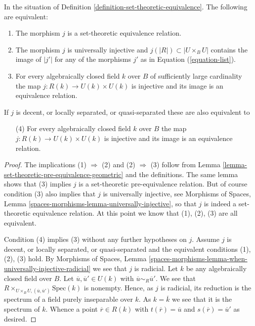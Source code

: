 \begin{lemma}
\label{lemma-set-theoretic-equivalence-geometric}
In the situation of Definition \ref{definition-set-theoretic-equivalence}.
The following are equivalent:
\begin{enumerate}
\item The morphism $j$ is a set-theoretic equivalence relation.
\item The morphism $j$ is universally injective and
$j(|R|) \subset |U \times_B U|$ contains the image of
$|j'|$ for any of the morphisms $j'$ as in Equation (\ref{equation-list}).
\item For every algebraically closed field $k$ over $B$ of sufficiently large
cardinality the map $j : R(k) \to U(k) \times U(k)$ is injective and
its image is an equivalence relation.
\end{enumerate}
If $j$ is decent, or locally separated, or quasi-separated
these are also equivalent to
\begin{enumerate}
\item[(4)] For every algebraically closed field $k$ over $B$
the map $j : R(k) \to U(k) \times U(k)$ is injective and its image
is an equivalence relation.
\end{enumerate}
\end{lemma}

\begin{proof}
The implications (1) $\Rightarrow$ (2) and (2) $\Rightarrow$ (3) follow from
Lemma \ref{lemma-set-theoretic-pre-equivalence-geometric}
and the definitions. The same lemma shows that (3) implies
$j$ is a set-theoretic pre-equivalence relation. But of course condition
(3) also implies that $j$ is universally injective, see
Morphisms of Spaces, Lemma \ref{spaces-morphisms-lemma-universally-injective},
so that $j$ is indeed a set-theoretic equivalence relation.
At this point we know that (1), (2), (3) are all equivalent.

\medskip\noindent
Condition (4) implies (3) without any further hypotheses on $j$. Assume $j$
is decent, or locally separated, or quasi-separated and the equivalent
conditions (1), (2), (3) hold. By
Morphisms of Spaces,
Lemma \ref{spaces-morphisms-lemma-when-universally-injective-radicial}
we see that $j$ is radicial.
Let $k$ be any algebraically closed field over $B$. Let
$\overline{u}, \overline{u}' \in U(k)$ with
$\overline{u} \sim_R \overline{u}'$. We see that
$R \times_{U \times_B U, (\overline{u}, \overline{u}')} \text{Spec}(k)$
is nonempty. Hence, as $j$ is radicial, its reduction is the spectrum of a
field purely inseparable over $k$. As $k = \overline{k}$ we see that
it is the spectrum of $k$. Whence a point $\overline{r} \in R(k)$
with $t(\overline{r}) = \overline{u}$ and $s(\overline{r}) = \overline{u}'$
as desired.
\end{proof}


